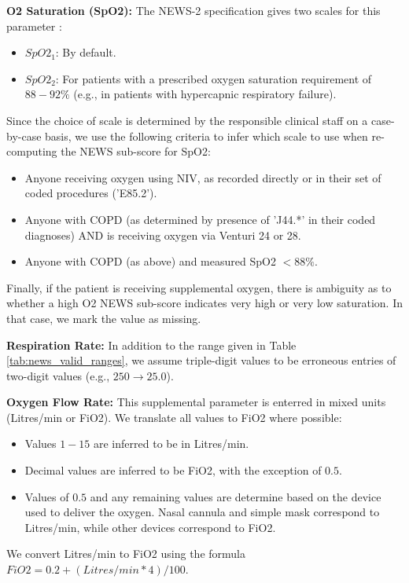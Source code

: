 \documentclass[10pt,journal, compsoc]{IEEEtran}
\begin{document}
\textbf{O2 Saturation (SpO2): } The NEWS-2 specification gives two scales for this parameter \cite[pp.~44]{RCP17}:
\begin{itemize}
    \item $SpO2_1$: By default.
    \item $SpO2_2$: For patients with a prescribed oxygen saturation requirement of $88-92\%$ (e.g., in patients with hypercapnic respiratory failure).
\end{itemize}
Since the choice of scale is determined by the responsible clinical staff on a case-by-case basis, we use the following criteria to infer which scale to use when re-computing the NEWS sub-score for SpO2:
\begin{itemize}
    \item Anyone receiving oxygen using NIV, as recorded directly or in their set of coded procedures ('E85.2').
    \item Anyone with COPD (as determined by presence of 'J44.*' in their coded diagnoses) AND is receiving oxygen via Venturi 24 or 28.
    \item Anyone with COPD (as above) and measured SpO2 $<88\%$.
\end{itemize}
Finally, if the patient is receiving supplemental oxygen, there is ambiguity as to whether a high O2 NEWS sub-score indicates very high or very low saturation. In that case, we mark the value as missing.

\textbf{Respiration Rate: } In addition to the range given in Table \ref{tab:news_valid_ranges}, we assume triple-digit values to be erroneous entries of two-digit values (e.g., $250 \rightarrow 25.0$).

\textbf{Oxygen Flow Rate: } This supplemental parameter is enterred in mixed units (Litres/min or FiO2). We translate all values to FiO2 where possible:
\begin{itemize}
    \item Values $1-15$ are inferred to be in Litres/min.
    \item Decimal values are inferred to be FiO2, with the exception of $0.5$.
    \item Values of $0.5$ and any remaining values are determine based on the device used to deliver the oxygen. Nasal cannula and simple mask correspond to Litres/min, while other devices correspond to FiO2.
\end{itemize}
We convert Litres/min to FiO2 using the formula $FiO2 = 0.2 + (Litres/min * 4)/100$.

\newpage
\end{document}
